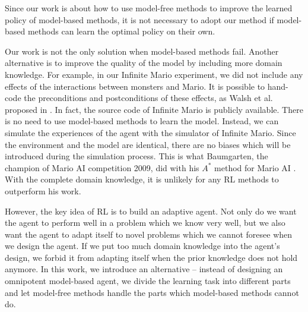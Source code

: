 Since our work is about how to use model-free methods to improve the learned policy of model-based methods,
it is not necessary to adopt our method if model-based methods can learn the optimal policy
on their own.


Our work is not the only solution when model-based methods fail.
Another alternative is to improve the quality of the model by including more domain knowledge.
For example, in our Infinite Mario experiment, we did not include any effects 
of the interactions between monsters and Mario. It is possible to
hand-code the preconditions and postconditions of these effects, as Walsh et al. proposed in \cite{Walsh09}.
In fact, the source code of Infinite Mario is publicly available.
There is no need to use model-based methods to learn the model. Instead,
we can simulate the experiences of the agent with the simulator of Infinite Mario. 
Since the environment and the model are identical, there are no biases which will be 
introduced during the simulation process.
This is what Baumgarten, the champion of Mario AI competition 2009, did with his $A^*$ method for Mario AI \cite{Robin09}.
With the complete domain knowledge, it is unlikely for any RL methods to outperform his work.



However, the key idea of RL is to build an adaptive agent.
Not only do we want the agent to perform well in a problem which we know very well,
but we also want the agent to adapt itself to novel problems which we cannot foresee when we design the agent.
If we put too much domain knowledge into the agent's design, we forbid it from adapting 
itself when the prior knowledge does not hold anymore. 
In this work, we introduce an alternative -- instead of designing an omnipotent model-based agent, we
divide the learning task into different parts and let model-free methods handle the parts which model-based methods cannot do.


